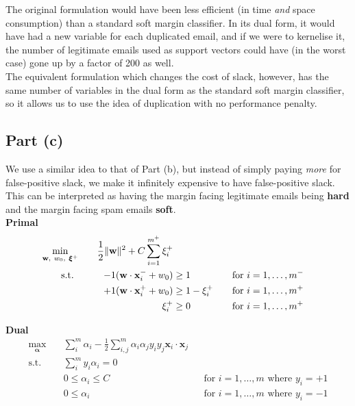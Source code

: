 The original formulation would have been less efficient (in time \textit{and} space consumption) than a standard soft margin classifier. In its dual form, it would have had a new variable for each duplicated email, and if we were to kernelise it, the number of legitimate emails used as support vectors could have (in the worst case) gone up by a factor of 200 as well.\\[1em]

The equivalent formulation which changes the cost of slack, however, has the same number of variables in the dual form as the standard soft margin classifier, so it allows us to use the idea of duplication with no performance penalty.

\subsection{Part (c)}
We use a similar idea to that of Part (b), but instead of simply paying \textit{more} for false-positive slack, we make it infinitely expensive to have false-positive slack. This can be interpreted as having the margin facing legitimate emails being \textbf{hard} and the margin facing spam emails \textbf{soft}.\\[1em]

\noindent\textbf{Primal}
\begin{alignat*}{3}
  \min_{\mathbf{w},~w_0,~\boldsymbol\xi^+}\quad&&\frac{1}{2}\lVert\mathbf{w}\rVert^2 + C\sum_{i=1}^{m^+}\xi_i^+\\
  \text{s.t. }\quad&&-1(\mathbf{w}\cdot\mathbf{x}_i^-+w_0) & \geq 1 &&\quad\text{for }i = 1,\ldots,m^-
  \\ &&+1(\mathbf{w}\cdot\mathbf{x}_i^++w_0) & \geq 1 - \xi_i^+ &&\quad\text{for }i = 1,\ldots,m^+
  \\ &&\xi_i^+ & \geq 0 &&\quad\text{for }i=1,\ldots,m^+
\end{alignat*}

\noindent\textbf{Dual}
\begin{align*}
  \max_{\boldsymbol\alpha}\quad&\sum_{i}^m\alpha_i-\frac{1}{2}\sum_{i,j}^{m}\alpha_i\alpha_jy_iy_j\mathbf{x}_i\cdot\mathbf{x}_j\\
  \text{s.t.}\quad&\sum_i^my_i\alpha_i = 0
  \\ & 0\leq\alpha_i\leq C && \text{for }i=1,\ldots,m\text{ where }y_i=+1
  \\ & 0\leq\alpha_i &&\text{for }i=1,\ldots,m\text{ where }y_i=-1
\end{align*}

